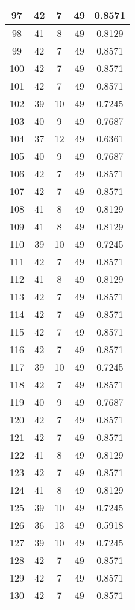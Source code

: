 \documentclass[letterpaper, 12pt]{article}
\begin{document}
\begin{longtable}{|c|c|c|c|c|}
\hline
97 & 42 & 7 & 49 & 0.8571 \\
\hline
98 & 41 & 8 & 49 & 0.8129 \\
\hline
99 & 42 & 7 & 49 & 0.8571 \\
\hline
100 & 42 & 7 & 49 & 0.8571 \\
\hline
101 & 42 & 7 & 49 & 0.8571 \\
\hline
102 & 39 & 10 & 49 & 0.7245 \\
\hline
103 & 40 & 9 & 49 & 0.7687 \\
\hline
104 & 37 & 12 & 49 & 0.6361 \\
\hline
105 & 40 & 9 & 49 & 0.7687 \\
\hline
106 & 42 & 7 & 49 & 0.8571 \\
\hline
107 & 42 & 7 & 49 & 0.8571 \\
\hline
108 & 41 & 8 & 49 & 0.8129 \\
\hline
109 & 41 & 8 & 49 & 0.8129 \\
\hline
110 & 39 & 10 & 49 & 0.7245 \\
\hline
111 & 42 & 7 & 49 & 0.8571 \\
\hline
112 & 41 & 8 & 49 & 0.8129 \\
\hline
113 & 42 & 7 & 49 & 0.8571 \\
\hline
114 & 42 & 7 & 49 & 0.8571 \\
\hline
115 & 42 & 7 & 49 & 0.8571 \\
\hline
116 & 42 & 7 & 49 & 0.8571 \\
\hline
117 & 39 & 10 & 49 & 0.7245 \\
\hline
118 & 42 & 7 & 49 & 0.8571 \\
\hline
119 & 40 & 9 & 49 & 0.7687 \\
\hline
120 & 42 & 7 & 49 & 0.8571 \\
\hline
121 & 42 & 7 & 49 & 0.8571 \\
\hline
122 & 41 & 8 & 49 & 0.8129 \\
\hline
123 & 42 & 7 & 49 & 0.8571 \\
\hline
124 & 41 & 8 & 49 & 0.8129 \\
\hline
125 & 39 & 10 & 49 & 0.7245 \\
\hline
126 & 36 & 13 & 49 & 0.5918 \\
\hline
127 & 39 & 10 & 49 & 0.7245 \\
\hline
128 & 42 & 7 & 49 & 0.8571 \\
\hline
129 & 42 & 7 & 49 & 0.8571 \\
\hline
130 & 42 & 7 & 49 & 0.8571 \\

\end{longtable}
\end{document}
